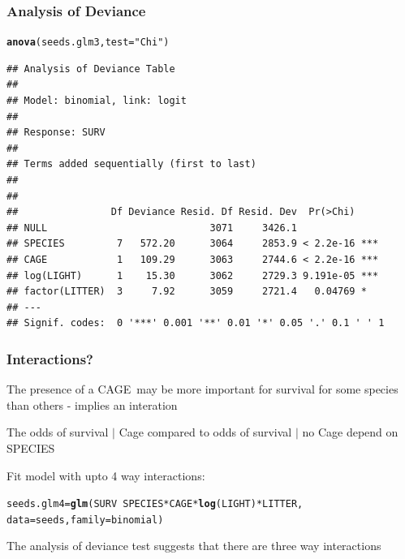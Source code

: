 \documentclass[handout]{beamer}\usepackage[]{graphicx}\usepackage[]{color}
\makeatletter
\newcommand{\hlstr}[1]{\textcolor[rgb]{0.192,0.494,0.8}{#1}}%
\newcommand{\hlopt}[1]{\textcolor[rgb]{0,0,0}{#1}}%
\newcommand{\hlstd}[1]{\textcolor[rgb]{0.345,0.345,0.345}{#1}}%
\newcommand{\hlkwb}[1]{\textcolor[rgb]{0.69,0.353,0.396}{#1}}%
\newcommand{\hlkwc}[1]{\textcolor[rgb]{0.333,0.667,0.333}{#1}}%
\newcommand{\hlkwd}[1]{\textcolor[rgb]{0.737,0.353,0.396}{\textbf{#1}}}%
\newenvironment{kframe}{%
 \def\at@end@of@kframe{}%
 \ifinner\ifhmode%
  \def\at@end@of@kframe{\end{minipage}}%
  \begin{minipage}{\columnwidth}%
 \fi\fi%
 \def\FrameCommand##1{\hskip\@totalleftmargin \hskip-\fboxsep
 \colorbox{shadecolor}{##1}\hskip-\fboxsep
     \hskip-\linewidth \hskip-\@totalleftmargin \hskip\columnwidth}%
 \MakeFramed {\advance\hsize-\width
   \@totalleftmargin\z@ \linewidth\hsize
   \@setminipage}}%
 {\par\unskip\endMakeFramed%
 \at@end@of@kframe}
\newenvironment{knitrout}{}{} %
\def\C{\textsf{CAGE}}
\def\V{\textsf{SPECIES}}
\makeatother
\begin{document}
\begin{frame}[fragile]\frametitle{Analysis of Deviance}
\begin{knitrout}
\color{fgcolor}\begin{kframe}
\begin{alltt}
\hlkwd{anova}\hlstd{(seeds.glm3,} \hlkwc{test}\hlstd{=}\hlstr{"Chi"}\hlstd{)}
\end{alltt}
\begin{verbatim}
## Analysis of Deviance Table
## 
## Model: binomial, link: logit
## 
## Response: SURV
## 
## Terms added sequentially (first to last)
## 
## 
##                Df Deviance Resid. Df Resid. Dev  Pr(>Chi)    
## NULL                            3071     3426.1              
## SPECIES         7   572.20      3064     2853.9 < 2.2e-16 ***
## CAGE            1   109.29      3063     2744.6 < 2.2e-16 ***
## log(LIGHT)      1    15.30      3062     2729.3 9.191e-05 ***
## factor(LITTER)  3     7.92      3059     2721.4   0.04769 *  
## ---
## Signif. codes:  0 '***' 0.001 '**' 0.01 '*' 0.05 '.' 0.1 ' ' 1
\end{verbatim}
\end{kframe}
\end{knitrout}
\end{frame}
\begin{frame}[fragile]\frametitle{Interactions?}
The presence of a \C\ may be more important for survival for some
species than others - implies an interation \pause

The odds of survival $|$ Cage  compared to odds of survival $|$ no Cage
depend on \V \pause

Fit model with upto 4 way interactions:
\begin{knitrout}
\color{fgcolor}\begin{kframe}
\begin{alltt}
\hlstd{seeds.glm4} \hlkwb{=} \hlkwd{glm}\hlstd{(SURV}\hlopt{~}\hlstd{SPECIES}\hlopt{*}\hlstd{CAGE}\hlopt{*}\hlkwd{log}\hlstd{(LIGHT)}\hlopt{*}\hlstd{LITTER,}
             \hlkwc{data}\hlstd{=seeds,} \hlkwc{family}\hlstd{=binomial)}
\end{alltt}
\end{kframe}
\end{knitrout}


The analysis of deviance test suggests that there are three way interactions
\end{frame}
\end{document}
